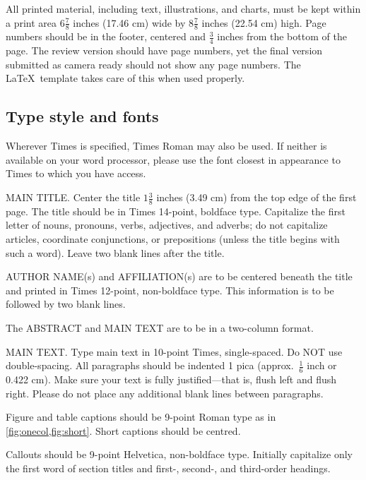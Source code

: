 \documentclass[10pt,twocolumn,letterpaper]{article}
\begin{document}
    All printed material, including text, illustrations, and charts, must be kept
    within a print area $6\frac{7}{8}$ inches (17.46 cm) wide by $8\frac{7}{8}$ inches (22.54 cm)
    high.
%
    Page numbers should be in the footer, centered and $\frac{3}{4}$ inches from the bottom of the page.
    The review version should have page numbers, yet the final version submitted as camera ready should not show any page numbers.
    The \LaTeX\ template takes care of this when used properly.



    \subsection{Type style and fonts}

    Wherever Times is specified, Times Roman may also be used.
    If neither is available on your word processor, please use the font closest in
    appearance to Times to which you have access.

    MAIN TITLE.
    Center the title $1\frac{3}{8}$ inches (3.49 cm) from the top edge of the first page.
    The title should be in Times 14-point, boldface type.
    Capitalize the first letter of nouns, pronouns, verbs, adjectives, and adverbs;
    do not capitalize articles, coordinate conjunctions, or prepositions (unless the title begins with such a word).
    Leave two blank lines after the title.

    AUTHOR NAME(s) and AFFILIATION(s) are to be centered beneath the title
    and printed in Times 12-point, non-boldface type.
    This information is to be followed by two blank lines.

    The ABSTRACT and MAIN TEXT are to be in a two-column format.

    MAIN TEXT.
    Type main text in 10-point Times, single-spaced.
    Do NOT use double-spacing.
    All paragraphs should be indented 1 pica (approx.~$\frac{1}{6}$ inch or 0.422 cm).
    Make sure your text is fully justified---that is, flush left and flush right.
    Please do not place any additional blank lines between paragraphs.

    Figure and table captions should be 9-point Roman type as in \cref{fig:onecol,fig:short}.
    Short captions should be centred.

    \noindent Callouts should be 9-point Helvetica, non-boldface type.
    Initially capitalize only the first word of section titles and first-, second-, and third-order headings.
\end{document}
